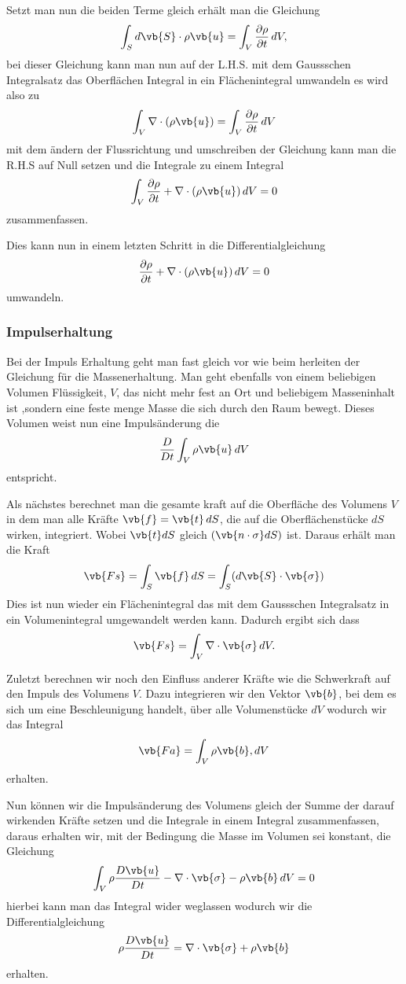 Setzt man nun die beiden Terme gleich erhält man die Gleichung 
\[\int_{S}d\vb{S}\cdot\rho\vb{u} 
=
\int_{V}\frac{\partial \rho}{\partial t} \, dV ,\] 
bei dieser Gleichung kann man nun auf der L.H.S. mit dem Gaussschen Integralsatz das Oberflächen Integral in ein Flächenintegral umwandeln es wird also zu
\[\int_{V}\nabla\cdot(\rho\vb{u}) 
=
\int_{V}\frac{\partial \rho}{\partial t} \, dV \]
mit dem ändern der Flussrichtung und umschreiben der Gleichung kann man die R.H.S auf Null setzen und die Integrale zu einem Integral
\[\int_{V}\frac{\partial \rho}{\partial t} + \nabla\cdot(\rho\vb{u})  \, dV 
= 
0\]
zusammenfassen.

Dies kann nun in einem letzten Schritt in die Differentialgleichung
\[\frac{\partial \rho}{\partial t} + \nabla\cdot(\rho\vb{u})  \, dV 
= 
0\] 
umwandeln.

\subsubsection{Impulserhaltung}
Bei der Impuls Erhaltung geht man fast gleich vor wie beim herleiten der Gleichung für die Massenerhaltung.
Man geht ebenfalls von einem beliebigen Volumen Flüssigkeit, $V$, das nicht mehr fest an Ort und beliebigem Masseninhalt ist ,sondern eine feste menge Masse die sich durch den Raum bewegt.
Dieses Volumen weist nun eine Impulsänderung die 
\[\frac{D}{Dt}\int_{V}\rho\vb{u}\, dV\]
entspricht.

Als nächstes berechnet man die gesamte kraft auf die Oberfläche des Volumens $V$ in dem man alle Kräfte $\vb{f} = \vb{t}\,dS$, die auf die Oberflächenstücke $dS$ wirken, integriert.
Wobei $\vb{t} dS$ gleich $(\vb{n\cdot\sigma}dS)$ ist. 
Daraus erhält man die Kraft 
\[\vb{Fs} 
=
\int_{S}\vb{f}\, dS
= \int_{S} (d\vb{S}\cdot\vb{\sigma})
\]
Dies ist nun wieder ein Flächenintegral das mit dem Gaussschen Integralsatz in ein Volumenintegral umgewandelt werden kann.
Dadurch ergibt sich dass
\[\vb{Fs} 
=
\int_{V}\nabla \cdot \vb{\sigma}\, dV
.\]

Zuletzt berechnen wir noch den Einfluss anderer Kräfte wie die Schwerkraft auf den Impuls des Volumens $V$.
Dazu integrieren wir den Vektor $\vb{b}$, bei dem es sich um eine Beschleunigung handelt, über alle Volumenstücke $dV$ wodurch wir das Integral
\[\vb{Fa} 
=
\int_{V}\rho\vb{b}, dV
\]
erhalten.

Nun können wir die Impulsänderung des Volumens gleich der Summe der darauf wirkenden Kräfte setzen und die Integrale in einem Integral zusammenfassen, daraus erhalten wir, mit der Bedingung die Masse im Volumen sei konstant, die Gleichung 
\[\int_{V} \rho \frac{D\vb{u}}{Dt} - \nabla \cdot \vb{\sigma} -\rho \vb{b}\, dV
=
0
\]
hierbei kann man das Integral wider weglassen wodurch wir die Differentialgleichung
\[\rho \frac{D\vb{u}}{Dt}
= 
\nabla \cdot \vb{\sigma} +\rho \vb{b}
\]
erhalten.

